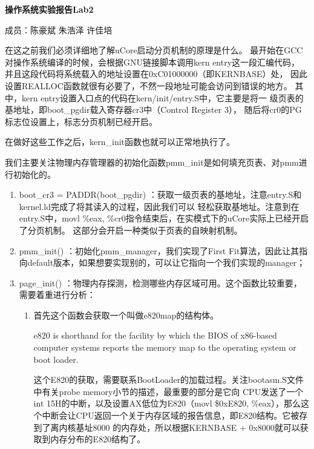 \documentclass[UTF8, a4paper]{ctexart}
\begin{document}
\centerline{\textbf{\LARGE{操作系统实验报告Lab2}}}
\bigskip
\centerline{\large{成员：陈豪斌 \quad 朱浩泽 \quad 许佳培}}
\bigskip
    在这之前我们必须详细地了解uCore启动分页机制的原理是什么。
    最开始在GCC对操作系统编译的时候，会根据GNU链接脚本调用kern entry这一段汇编代码，
    并且这段代码将系统载入的地址设置在0xC01000000（即KERNBASE）处，
    因此设置REALLOC函数就很有必要了，不然一段地址可能会访问到错误的地方。
    其中，kern entry设置入口点的代码在kern/init/entry.S中，它主要是将一
    级页表的基地址，即boot\_pgdir载入寄存器cr3中（Control Register 3），
    随后将cr0的PG标志位设置上，标志分页机制已经开启。
    \par 
    在做好这些工作之后，kern\_init函数也就可以正常地执行了。
    \bigskip
    \par 
    我们主要关注物理内存管理器的初始化函数pmm\_init是如何填充页表、对pmm进行初始化的。
    \begin{enumerate}
        \item boot\_cr3 = PADDR(boot\_pgdir) ：获取一级页表的基地址，注意entry.S和kernel.ld完成了将其读入的过程，因此我们可以
              轻松获取基地址。注意到在entry.S中，movl \%eax, \%cr0指令结束后，在实模式下的uCore实际上已经开启了分页机制。
              这部分会开启一种类似于页表的自映射机制。
        \item pmm\_init() ：初始化pmm\_manager，我们实现了First Fit算法，因此让其指向default版本，如果想要实现别的，可以让它指向一个我们实现的manager；
        \item page\_init() ：物理内存探测，检测哪些内存区域可用。这个函数比较重要，需要着重进行分析：
            {
                \begin{enumerate}
                    \item 首先这个函数会获取一个叫做e820map的结构体。
                            \par
                            e820 is shorthand for the facility by which the BIOS of x86-based computer systems reports the memory map to the operating system or boot loader.
                            \par
                            这个E820的获取，需要联系BootLoader的加载过程。关注bootasm.S文件中有关probe memory小节的描述，最重要的部分是它向
                            CPU发送了一个int 15H的中断，以及设置AX低位为E820（movl \$0xE820, \%eax），那么这个中断会让CPU返回一个关于内存区域的报告信息，即E820结构。它被存到了离内核基址8000
                            的内存处，所以根据KERNBASE + 0x8000就可以获取到内存分布的E820结构了。
                \end{enumerate}
            }
    \end{enumerate} 
\end{document}
